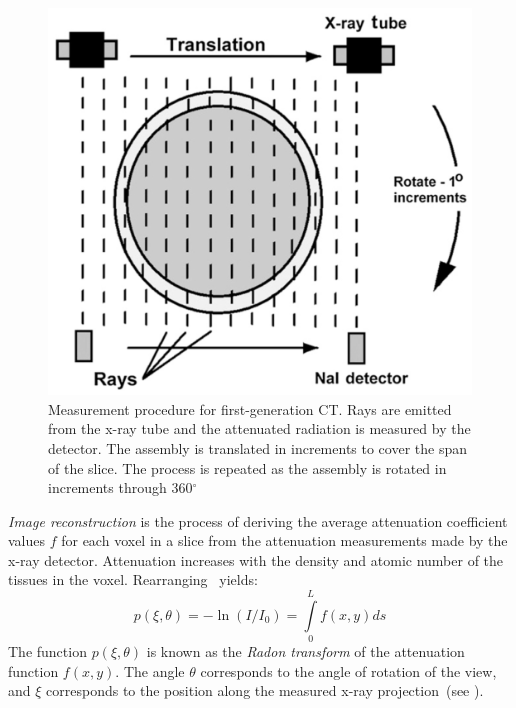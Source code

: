 \begin{figure}[ht]
\centering
		\includegraphics[scale=0.3]{media/0-imaging/ct2.png}
%
\caption{Measurement procedure for first-generation CT. Rays are emitted from the x-ray tube and the attenuated radiation is measured by the detector. The assembly is translated in increments to cover the span of the slice. The process is repeated as the assembly is rotated in increments through 360$^{\circ}$~\cite{goldman_2007}}
\label{fig:ct2}
\end{figure}

\textit{Image reconstruction} is the process of deriving the average attenuation coefficient values $f$ for each voxel in a slice from the attenuation measurements made by the x-ray detector. Attenuation increases with the density and atomic number of the tissues in the voxel. Rearranging~ yields:
\begin{equation}
p(\xi, \theta) = -\ln(I/I_0) = \int\limits_{0}^{L}f(x,y) ds
\end{equation}
The function $p(\xi,\theta)$ is known as the \textit{Radon transform} of the attenuation function $f(x,y)$. The angle $\theta$ corresponds to the angle of rotation of the view, and $\xi$ corresponds to the position along the measured x-ray projection~(see ).

